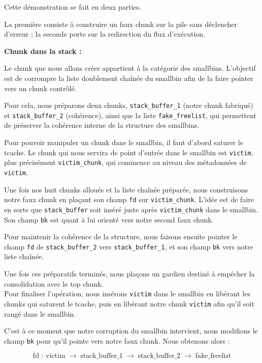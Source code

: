 Cette démonstration se fait en deux parties.

La première consiste à construire un faux chunk sur la pile sans déclencher d'erreur ;
la seconde porte sur la redirection du flux d'exécution.

\textbf{Chunk dans la stack :}

Le chunk que nous allons créer appartient à la catégorie des smallbins.
L’objectif est de corrompre la liste doublement chaînée du smallbin afin
de la faire pointer vers un chunk contrôlé.

Pour cela, nous préparons deux chunks, \texttt{stack\_buffer\_1} (notre chunk
fabriqué) et \texttt{stack\_buffer\_2} (cohérence), ainsi que la liste
\texttt{fake\_freelist}, qui permettent de préserver la cohérence interne
de la structure des smallbins.

Pour pouvoir manipuler un chunk dans le smallbin, il faut d’abord saturer
le tcache. Le chunk qui nous servira de point d’entrée dans le smallbin est
\texttt{victim}, plus précisément \texttt{victim\_chunk}, qui commence au
niveau des métadonnées de \texttt{victim}.

Une fois nos huit chunks alloués et la liste chaînée préparée, nous
construisons notre faux chunk en plaçant son champ \texttt{fd} sur
\texttt{victim\_chunk}. L’idée est de faire en sorte que \texttt{stack\_buffer}
soit inséré juste après \texttt{victim\_chunk} dans le smallbin. Son champ
\texttt{bk} est quant à lui orienté vers notre second faux chunk.

Pour maintenir la cohérence de la structure, nous faisons ensuite pointer
le champ \texttt{fd} de \texttt{stack\_buffer\_2} vers \texttt{stack\_buffer\_1},
et son champ \texttt{bk} vers notre liste chaînée.

Une fois ces préparatifs terminés, nous plaçons un gardien destiné à
empêcher la consolidation avec le top chunk.\\
Pour finaliser l’opération, nous insérons \texttt{victim} dans le smallbin
en libérant les chunks qui saturent le tcache, puis en libérant notre chunk
\texttt{victim} afin qu’il soit rangé dans le smallbin.

C’est à ce moment que notre corruption du smallbin intervient, nous
modifions le champ \texttt{bk} pour qu’il pointe vers notre faux chunk.
Nous obtenons alors :



\[
       \text{fd : } \text{victim} \;\rightarrow\; \text{stack\_buffer\_1} \;\rightarrow\;
       \text{stack\_buffer\_2} \;\rightarrow\; \text{fake\_freelist}
\]





